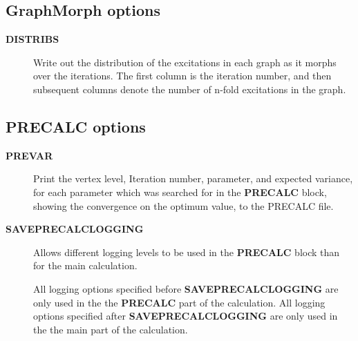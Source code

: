 \documentclass[openany,a4paper,10pt]{manual}
\begin{document}
\subsection{GraphMorph options}
\begin{description}
\item[\textbf{DISTRIBS}]
Write out the distribution of the excitations in each graph as it
morphs over the iterations. The first column is the iteration number, and
then subsequent columns denote the number of n-fold excitations in
the graph.

\end{description}


\subsection{PRECALC options}
\begin{description}
\item[\textbf{PREVAR}]
Print the vertex level, Iteration number, parameter, and expected
variance, for each parameter which was searched for in the \textbf{PRECALC}
block, showing the convergence on the optimum value, to the PRECALC
file.

\item[\textbf{SAVEPRECALCLOGGING}]
Allows different logging levels to be used in the \textbf{PRECALC} block
than for the main calculation.

All logging options specified before \textbf{SAVEPRECALCLOGGING} are only
used in the the \textbf{PRECALC} part of the calculation.  All logging
options specified after  \textbf{SAVEPRECALCLOGGING} are only used in the
the main part of the calculation.

\end{description}
\end{document}
